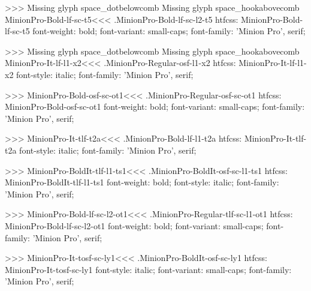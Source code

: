 {>>>
Missing glyph	space_dotbelowcomb
Missing glyph	space_hookabovecomb
\<MinionPro-Bold-lf-sc-t5\><<<
.MinionPro-Bold-lf-sc-l2-t5
htfcss:  MinionPro-Bold-lf-sc-t5  font-weight: bold; font-variant: small-caps; font-family: 'Minion Pro', serif;

>>>
Missing glyph	space_dotbelowcomb
Missing glyph	space_hookabovecomb
\<MinionPro-It-lf-l1-x2\><<<
.MinionPro-Regular-osf-l1-x2
htfcss:  MinionPro-It-lf-l1-x2  font-style: italic; font-family: 'Minion Pro', serif;

>>>
\<MinionPro-Bold-osf-sc-ot1\><<<
.MinionPro-Regular-osf-sc-ot1
htfcss:  MinionPro-Bold-osf-sc-ot1  font-weight: bold; font-variant: small-caps; font-family: 'Minion Pro', serif;

>>>
\<MinionPro-It-tlf-t2a\><<<
.MinionPro-Bold-lf-l1-t2a
htfcss:  MinionPro-It-tlf-t2a  font-style: italic; font-family: 'Minion Pro', serif;

>>>
\<MinionPro-BoldIt-tlf-l1-ts1\><<<
.MinionPro-BoldIt-osf-sc-l1-ts1
htfcss:  MinionPro-BoldIt-tlf-l1-ts1  font-weight: bold; font-style: italic; font-family: 'Minion Pro', serif;

>>>
\<MinionPro-Bold-lf-sc-l2-ot1\><<<
.MinionPro-Regular-tlf-sc-l1-ot1
htfcss:  MinionPro-Bold-lf-sc-l2-ot1  font-weight: bold; font-variant: small-caps; font-family: 'Minion Pro', serif;

>>>
\<MinionPro-It-tosf-sc-ly1\><<<
.MinionPro-BoldIt-osf-sc-ly1
htfcss:  MinionPro-It-tosf-sc-ly1  font-style: italic; font-variant: small-caps; font-family: 'Minion Pro', serif;

}
